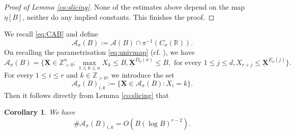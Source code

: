 \documentclass[11pt,letterpaper]{amsart}
\newcommand{\BR}{{\mathbb {R}}}
\newcommand{\BZ}{{\mathbb {Z}}}
\newcommand{\CA}{{\mathcal {A}}}
\newcommand{\XX}{\underline{\mathbf{X}}}
\theoremstyle{plain}
\numberwithin{equation}{section}
\newtheorem{corollary}[theorem]{Corollary}
\theoremstyle{definition}
\theoremstyle{remark}
\begin{document}
\begin{proof}[Proof of Lemma \ref{co:slicing}]
	None of the estimates above depend on the map $\eta[B]$, neither do any implied constants. This finishes the proof.
\end{proof}

We recall \eqref{eq:CAB} and define
\begin{equation}\label{eq:CAsigmaB}
	\CA_\sigma(B):=\CA(B)\cap \pi^{-1}(C_{\sigma}(\BR)).
\end{equation} 
On recalling the parametrisation \eqref{eq:univmap}
(cf. \cite[11.22, 11.23]{Salberger}), we have
\begin{equation}\label{eq:CAsigmaBcond}
	\CA_\sigma(B)=\{\XX\in\BZ_{>0}^n:\max_{1\leqslant k\leqslant n}X_k\leqslant B,\XX^{D_0(\sigma)}\leqslant B,\text{ for every }1\leqslant j\leqslant d,X_{r+j}\leqslant \XX^{E_\sigma(j)}\}.
\end{equation}
For every $1\leqslant i\leqslant r$ and $k\in\BZ_{>0}$, we introduce the set
\begin{equation}\label{eq:CAsigmaik}
	\CA_{\sigma}(B)_{i,k}:=\{\XX\in\CA_{\sigma}(B):X_i=k\}.
\end{equation} Then it follows directly from Lemma \ref{co:slicing}  that
\begin{corollary}\label{co:CAsigmaikbd}
	We have $$\#\CA_{\sigma}(B)_{i,k}=O(B(\log B)^{r-2}).$$
\end{corollary} 
\end{document}
